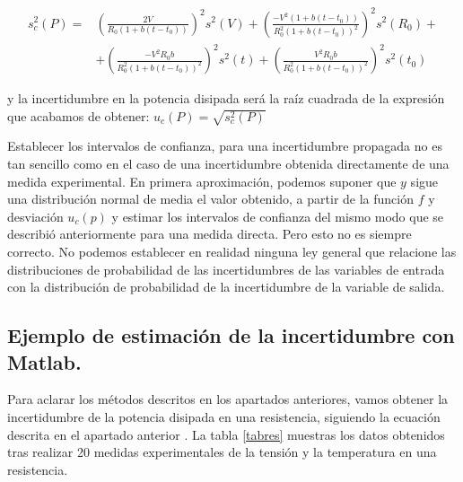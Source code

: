 \begin{align*}
s_c^2(P) =& \left(\frac{2V}{R_0\left(1+b(t-t_0)\right)}\right)^2 s^2(V)+ \left(\frac{-V^2\left(1+b(t-t_0)\right)}{R_0^2\left(1+b(t-t_0)\right)^2}\right)^2 s^2(R_0)+\\
&+ \left(\frac{-V^2R_0b}{R_0^2\left(1+b(t-t_0)\right)^2}\right)^2 s^2(t)+\left(\frac{V^2R_0b}{R_0^2\left(1+b(t-t_0)\right)^2}\right)^2 s^2(t_0)    
\end{align*}

y la incertidumbre en la potencia disipada será la raíz cuadrada de la expresión que acabamos de obtener: $u_c(P) =\sqrt{s_c^2(P)} $

Establecer los intervalos de confianza, para una incertidumbre propagada no es tan sencillo como en el caso de una incertidumbre obtenida directamente de una medida experimental. En primera aproximación, podemos suponer que $y$ sigue una distribución normal de media el valor obtenido, a partir de la función $f$ y desviación $u_c(p)$ y estimar los intervalos de confianza del mismo modo que se describió anteriormente para una medida directa.  Pero esto no es siempre correcto. No podemos establecer en realidad ninguna ley general que relacione las distribuciones de probabilidad de las incertidumbres de las variables de entrada con la distribución de probabilidad de la incertidumbre de la variable de salida.

\subsection{Ejemplo de estimación de la incertidumbre con Matlab.}

Para aclarar los métodos descritos en los apartados anteriores, vamos obtener la incertidumbre de la potencia disipada en una resistencia, siguiendo la ecuación descrita en el apartado anterior . La tabla \ref{tabres} muestras los datos obtenidos tras realizar 20 medidas experimentales de la tensión y la temperatura en una resistencia.

